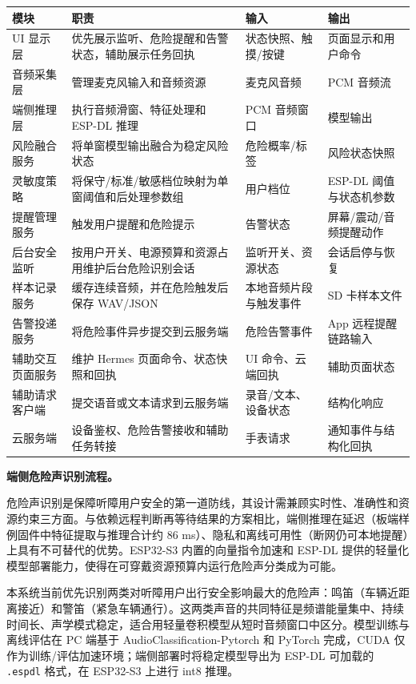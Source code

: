 \documentclass[UTF8,a4paper,12pt]{ctexart}
\begin{document}
\noindent\begin{longtable}{>{\raggedright\arraybackslash}p{3.2cm}>{\RaggedRight\arraybackslash}p{3.6cm}>{\RaggedRight\arraybackslash}p{2.6cm}>{\RaggedRight\arraybackslash}p{2.6cm}}
\toprule
模块 & 职责 & 输入 & 输出 \\
\midrule
UI 显示层 & 优先展示监听、危险提醒和告警状态，辅助展示任务回执 & 状态快照、触摸/按键 & 页面显示和用户命令 \\
音频采集层 & 管理麦克风输入和音频资源 & 麦克风音频 & PCM 音频流 \\
端侧推理层 & 执行音频滑窗、特征处理和 ESP-DL 推理 & PCM 音频窗口 & 模型输出 \\
风险融合服务 & 将单窗模型输出融合为稳定风险状态 & 危险概率/标签 & 风险状态快照 \\
灵敏度策略 & 将保守/标准/敏感档位映射为单窗阈值和后处理参数组 & 用户档位 & ESP-DL 阈值与状态机参数 \\
提醒管理服务 & 触发用户提醒和危险提示 & 告警状态 & 屏幕/震动/音频提醒动作 \\
后台安全监听 & 按用户开关、电源预算和资源占用维护后台危险识别会话 & 监听开关、资源状态 & 会话启停与恢复 \\
样本记录服务 & 缓存连续音频，并在危险触发后保存 WAV/JSON & 本地音频片段与触发事件 & SD 卡样本文件 \\
告警投递服务 & 将危险事件异步提交到云服务端 & 危险告警事件 & App 远程提醒链路输入 \\
辅助交互页面服务 & 维护 Hermes 页面命令、状态快照和回执 & UI 命令、云端回执 & 辅助页面状态 \\
辅助请求客户端 & 提交语音或文本请求到云服务端 & 录音/文本、设备状态 & 结构化响应 \\
云服务端 & 设备鉴权、危险告警接收和辅助任务转接 & 手表请求 & 通知事件与结构化回执 \\
\bottomrule
\end{longtable}

\noindent\textbf{端侧危险声识别流程。}

危险声识别是保障听障用户安全的第一道防线，其设计需兼顾实时性、准确性和资源约束三方面。与依赖远程判断再等待结果的方案相比，端侧推理在延迟（板端样例固件中特征提取与推理合计约 86 ms）、隐私和离线可用性（断网仍可本地提醒）上具有不可替代的优势。ESP32-S3 内置的向量指令加速和 ESP-DL 提供的轻量化模型部署能力，使得在可穿戴资源预算内运行危险声分类成为可能。

本系统当前优先识别两类对听障用户出行安全影响最大的危险声：鸣笛（车辆近距离接近）和警笛（紧急车辆通行）。这两类声音的共同特征是频谱能量集中、持续时间长、声学模式稳定，适合用轻量卷积模型从短时音频窗口中区分。模型训练与离线评估在 PC 端基于 AudioClassification-Pytorch 和 PyTorch 完成，CUDA 仅作为训练/评估加速环境；端侧部署时将稳定模型导出为 ESP-DL 可加载的 \texttt{.espdl} 格式，在 ESP32-S3 上进行 int8 推理。
\end{document}
